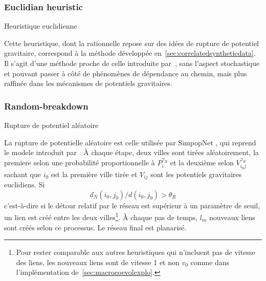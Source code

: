 
\subsubsection{Euclidian heuristic}{Heuristique euclidienne}



Cette heuristique, dont la rationnelle repose sur des idées de rupture de potentiel gravitaire, correspond à la méthode développée en~\ref{sec:correlatedsyntheticdata}. Il s'agit d'une méthode proche de celle introduite par~\cite{schmitt2014modelisation}, sans l'aspect stochastique et pouvant passer à côté de phénomènes de dépendance au chemin, mais plus raffinée dans les mécanismes de potentiels gravitaires.



\subsubsection{Random-breakdown}{Rupture de potentiel aléatoire}

La rupture de potentielle aléatoire est celle utilisée par SimpopNet \cite{schmitt2014modelisation}, qui reprend le modele introduit par \cite{blumenfeld2010network}. À chaque étape, deux villes sont tirées aléatoirement, la premiere selon une probabilité proportionnelle à $P_i^{\gamma_R}$ et la deuxième selon $V_{i_0j}^{\gamma_R}$ sachant que $i_0$ est la première ville tirée et $V_{ij}$ sont les potentiels gravitaires euclidiens. Si
\[
d_N(i_0,j_0) / d(i_0,j_0) > \theta_R
\]
c'est-à-dire si le détour relatif par le réseau est supérieur à un paramètre de seuil, un lien est créé entre les deux villes\footnote{Pour rester comparable aux autres heuristiques qui n'incluent pas de vitesse des liens, les nouveaux liens sont de vitesse 1 et non $v_0$ comme dans l'implémentation de~\ref{sec:macrocoevolexplo}.}. À chaque pas de temps, $l_m$ nouveaux liens sont créés selon ce processus. Le réseau final est planarisé.







